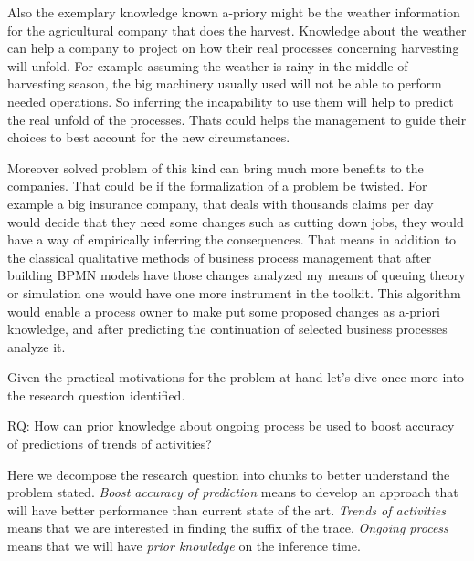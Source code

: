 Also the exemplary knowledge known a-priory might be the weather information for the agricultural company that does the harvest. Knowledge about the weather can help a company to project on how their real processes concerning harvesting will unfold. For example assuming the weather is rainy in the middle of harvesting season, the big machinery usually used will not be able to perform needed operations. So inferring the incapability to use them will help to predict the real unfold of the processes. Thats could helps the management to guide their choices to best account for the new circumstances. 


Moreover solved problem of this kind can bring much more benefits to the companies. That could be if the formalization of a problem be twisted. For example a big insurance company, that deals with thousands claims per day would decide that they need some changes such as cutting down jobs, they would have a way of empirically inferring the consequences. That means  in addition to the classical qualitative methods of business process management that after building BPMN models have those changes analyzed my means of queuing theory or simulation one would have one more instrument in the toolkit. This algorithm would enable a process owner to make put some proposed changes as a-priori knowledge, and after predicting the continuation of selected business processes analyze it. 

Given the practical motivations for the problem at hand let's dive once more into the research question identified.

RQ: How can prior knowledge about ongoing process be used to boost accuracy of predictions of trends of activities?

Here we decompose the research question into chunks to better understand the problem stated. \textit{Boost accuracy of prediction} means to develop an approach that will have better performance than current state of the art. \textit{Trends of activities} means that we are interested in finding the suffix of the trace. \textit{Ongoing process} means that we will have \textit{prior knowledge} on the inference time. 





